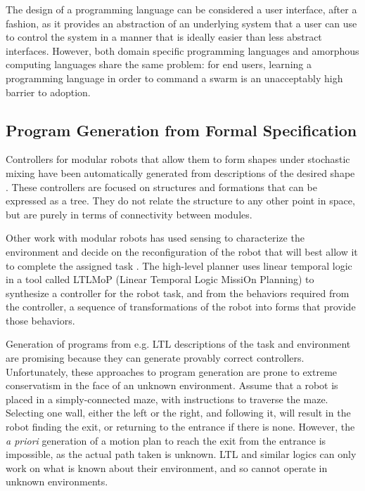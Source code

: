 The design of a programming language can be considered a user interface, after a fashion, as it provides an abstraction of an underlying system that a user can use to control the system in a manner that is ideally easier than less abstract interfaces. 
However, both domain specific programming languages and amorphous computing languages share the same problem: for end users, learning a programming language in order to command a swarm is an unacceptably high barrier to adoption. 

\subsection{Program Generation from Formal Specification} \label{section:Program_Generation}

Controllers for modular robots that allow them to form shapes under stochastic mixing have been automatically generated from descriptions of the desired shape \citep{klavins2002automatic}. 
These controllers are focused on structures and formations that can be expressed as a tree. 
They do not relate the structure to any other point in space, but are purely in terms of connectivity between modules. 

Other work with modular robots has used sensing to characterize the environment and decide on the reconfiguration of the robot that will best allow it to complete the assigned task \citep{daudelin2017integrated, jing2016end}.
The high-level planner uses linear temporal logic in a tool called LTLMoP (Linear Temporal Logic MissiOn Planning) to synthesize a controller for the robot task, and from the behaviors required from the controller, a sequence of transformations of the robot into forms that provide those behaviors. 
	
Generation of programs from e.g. LTL descriptions of the task and environment are promising because they can generate provably correct controllers.
Unfortunately, these approaches to program generation are prone to extreme conservatism in the face of an unknown environment. 
Assume that a robot is placed in a simply-connected maze, with instructions to traverse the maze. 
Selecting one wall, either the left or the right, and following it, will result in the robot finding the exit, or returning to the entrance if there is none. 
However, the \emph{a priori} generation of a motion plan to reach the exit from the entrance is impossible, as the actual path taken is unknown. 
LTL and similar logics can only work on what is known about their environment, and so cannot operate in unknown environments. 
	

